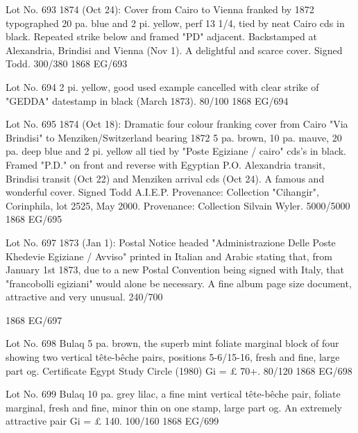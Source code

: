 \documentclass[justified]{tufte-book}
\begin{document}
%
{Lot No. 693
1874 (Oct 24): Cover from Cairo to Vienna franked by 1872 typographed 20 pa. blue and 2 pi. yellow, perf 13 1/4, tied by neat Cairo cds in black. Repeated strike below and framed "PD" adjacent. Backstamped at Alexandria, Brindisi and Vienna (Nov 1). A delightful and scarce cover. Signed Todd. 300/380
}%
{1868}%
{EG/693}%
{}%
{}
{}%
{}


%
{Lot No. 694
2 pi. yellow, good used example cancelled with clear strike of "GEDDA" datestamp in black (March 1873). 80/100
}%
{1868}%
{EG/694}%
{}%
{}
{}%
{}

%
{Lot No. 695
1874 (Oct 18): Dramatic four colour franking cover from Cairo "Via Brindisi" to Menziken/Switzerland bearing 1872 5 pa. brown, 10 pa. mauve, 20 pa. deep blue and 2 pi. yellow all tied by "Poste Egiziane / cairo" cds's in black. Framed "P.D." on front and reverse with Egyptian P.O. Alexandria transit, Brindisi transit (Oct 22) and Menziken arrival cds (Oct 24). A famous and wonderful cover. Signed Todd A.I.E.P. Provenance: Collection "Cihangir", Corinphila, lot 2525, May 2000. Provenance: Collection Silvain Wyler. 5000/5000
}%
{1868}%
{EG/695}%
{}%
{}
{}%
{}



%
{Lot No. 697
1873 (Jan 1): Postal Notice headed "Administrazione Delle Poste Khedevie Egiziane / Avviso" printed in Italian and Arabic stating that, from January 1st 1873, due to a new Postal Convention being signed with Italy, that "francobolli egiziani" would alone be necessary. A fine album page size document, attractive and very unusual. 240/700

}%
{1868}%
{EG/697}%
{}%
{}
{}%
{}

%
{Lot No. 698
Bulaq 5 pa. brown, the superb mint foliate marginal block of four showing two vertical tête-bêche pairs, positions 5-6/15-16, fresh and fine, large part og. Certificate Egypt Study Circle (1980) Gi = £ 70+. 80/120
}%
{1868}%
{EG/698}%
{}%
{}
{}%
{}

%
{Lot No. 699
Bulaq 10 pa. grey lilac, a fine mint vertical tête-bêche pair, foliate marginal, fresh and fine, minor thin on one stamp, large part og. An extremely attractive pair Gi = £ 140. 100/160
}%
{1868}%
{EG/699}%
{}%
{}
{}%
{}
\end{document}
